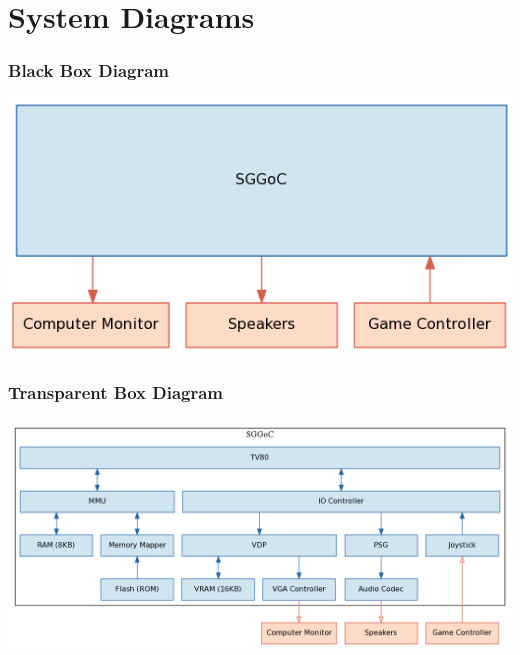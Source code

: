 \documentclass{beamer}
\begin{document}
\section{System Diagrams}
\begin{frame}
    \frametitle{Black Box Diagram}
    \begin{center}
        \includegraphics[width=\textwidth]{../block_diagrams/block_diagram_external.png}
    \end{center}
\end{frame}

\begin{frame}
    \frametitle{Transparent Box Diagram}
    \begin{center}
        \includegraphics[width=\textwidth]{../block_diagrams/block_diagram_internal.png}
    \end{center}
\end{frame}
\end{document}
